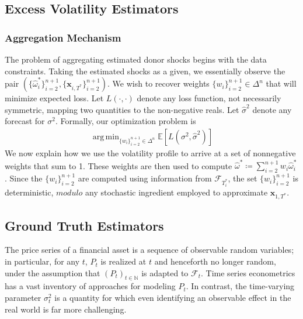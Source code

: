 \documentclass[11pt]{article}
\newcommand{\x}{\textbf{x}}
\def\mc#1{\mathcal{#1}} %
\DeclareMathOperator*{\argmin}{arg\,min} %
\def\E{\mathbb{E}} %
\def\mc#1{\mathcal{#1}}
\theoremstyle{definition}
\begin{document}
\subsection{Excess Volatility Estimators}
    \label{Excess Volatility Estimators}
\subsubsection{Aggregation Mechanism}
    \label{Aggregation Mechanism}
   
    The problem of aggregating estimated donor shocks begins with the data constraints.  Taking the estimated shocks as a given, we essentially observe the pair $(\{\hat\omega^{*}_{i}\}^{n+1}_{i=2},\{\x_{i,T^{*}}\}^{n+1}_{i=2})$.  We wish to recover weights $\{w_{i}\}^{n+1}_{i=2} \in \Delta^{n}$ that will minimize expected loss.  Let $L(\cdot,\cdot)$ denote any loss function, not necessarily symmetric, mapping two quantities to the non-negative reals.  Let $\hat\sigma^{2}$ denote any forecast for $\sigma^{2}$.  Formally, our optimization problem is \\ 

    \begin{align*}{
     \argmin_{\{w_{i}\}^{n+1}_{i=2} \in \Delta^{n}} \E[L(\sigma^{2}, \hat\sigma^{2})]
    }
    \end{align*}
We now explain how we use the volatility profile to arrive at a set of nonnegative weights that sum to 1.  These weights are then used to compute $\hat\omega^{*} \coloneq \sum^{n+1}_{i=2}w_{i}\hat\omega^{*}_{i}$.  Since the $\{w_{i}\}_{i=2}^{n+1}$ are computed using information from $\mathcal{F}_{T^{*}_{i}}$, the set $\{w_{i}\}_{i=2}^{n+1}$ is deterministic, $\textit{modulo}$ any stochastic ingredient employed to approximate $\x_{1,T^{*}}$.
  
    \subsection{Ground Truth Estimators}
    \label{Ground Truth Estimators}
    
    The price series of a financial asset is a sequence of observable random variables; in particular, for any $t$, $P_{t}$ is realized at $t$ and henceforth no longer random, under the assumption that $(P_{t})_{t\in\mathbb{N}}$ is adapted to $\mc{F}_{t}$.  Time series econometrics has a vast inventory of approaches for modeling $P_{t}$.  In contrast, the time-varying parameter $\sigma^{2}_{t}$ is a quantity for which even identifying an observable effect in the real world is far more challenging.
    
\end{document}
